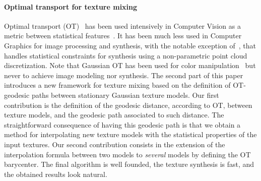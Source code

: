 \paragraph{Optimal transport for texture mixing}
Optimal transport (OT)~\cite{villani-topics} has been used intensively in Computer Vision as a metric between statistical features~\cite{rubner-emd}. It has been much less used in Computer Graphics for image processing and synthesis, with the notable exception of~\cite{rabin-textures}, that handles statistical constraints for synthesis using a non-parametric point cloud discretization. Note that Gaussian OT has been used for color manipulation~\cite{fpitie07a} but never to achieve image modeling nor synthesis.
The second part of this paper introduces a new framework for texture mixing based on the definition of OT-geodesic paths between stationary Gaussian texture models. Our first contribution is the definition of the geodesic distance, according to OT, between texture models, and the geodesic path associated to such distance. The straightforward consequence of having this geodesic path is that we obtain a method for interpolating new  texture models with the statistical properties of the input textures. Our second contribution consists in the extension of the interpolation formula between two models to \emph{several} models by defining the OT barycenter. The final algorithm is well founded,  the texture synthesis is fast, and the obtained results look natural.

